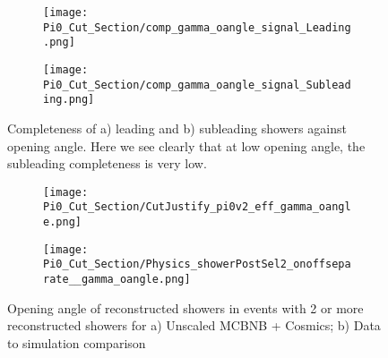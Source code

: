 \begin{figure}[H]
\centering
  \begin{subfigure}[t]{0.35\textwidth}
    \centering
\texttt{[image: Pi0\_Cut\_Section/comp\_gamma\_oangle\_signal\_Leading.png]}
  \caption{ }
  \end{subfigure} 
  \hspace{20mm}
  \begin{subfigure}[t]{0.35\textwidth}
    \centering
    \texttt{[image: Pi0\_Cut\_Section/comp\_gamma\_oangle\_signal\_Subleading.png]}
  \caption{ }
  \end{subfigure} 
\caption{ Completeness of a) leading and b) subleading showers against opening angle. Here we see clearly that at low opening angle, the subleading completeness is very low. }
\label{fig:comp_cutjust_pi0_OA}
\end{figure}

\begin{figure}[H]
\centering
  \begin{subfigure}[t]{0.35\textwidth}
    \centering
\texttt{[image: Pi0\_Cut\_Section/CutJustify\_pi0v2\_eff\_gamma\_oangle.png]}
  \caption{ }
  \end{subfigure} 
  \hspace{20mm}
  \begin{subfigure}[t]{0.35\textwidth}
    \centering
    \texttt{[image: Pi0\_Cut\_Section/Physics\_showerPostSel2\_onoffseparate\_\_gamma\_oangle.png]}
  \caption{ }
  \end{subfigure} 
\caption{ Opening angle of reconstructed showers in events with 2 or more reconstructed showers for a) Unscaled MCBNB + Cosmics; b) Data to simulation comparison }
\label{fig:cutjust_pi0_OA}
\end{figure}


